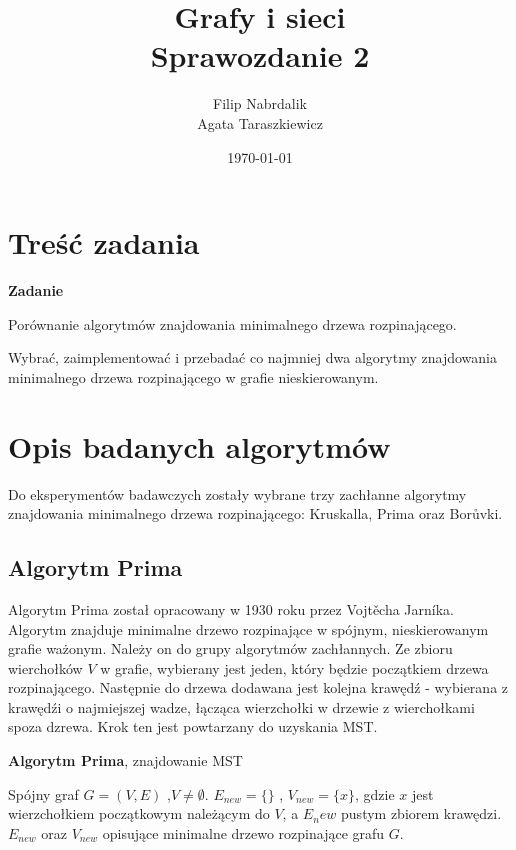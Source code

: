 \documentclass[a4paper, 10pt]{article}
\title{{\bf {Grafy i sieci}} \\ {\large Sprawozdanie 2}}
\date{\today}
\author{Filip Nabrdalik \\Agata Taraszkiewicz}
\begin{document}


\maketitle 




\newcommand{\ang}[1]{(ang. {\em #1}\/)}
\newcommand{\e}[1]{{\em #1}\/}





\section{Treść zadania}

{\bf{Zadanie}}

Porównanie algorytmów znajdowania minimalnego drzewa rozpinającego.

Wybrać, zaimplementować i przebadać co najmniej dwa algorytmy znajdowania minimalnego drzewa rozpinającego w grafie nieskierowanym. 

 

\section{Opis badanych algorytmów}

Do eksperymentów badawczych zostały wybrane trzy zachłanne algorytmy znajdowania minimalnego drzewa rozpinającego: Kruskalla, Prima oraz
Borůvki.

	\subsection{Algorytm Prima}
Algorytm Prima został opracowany w 1930 roku przez Vojtěcha Jarníka. Algorytm znajduje minimalne drzewo rozpinające w spójnym, nieskierowanym grafie ważonym. Należy on do grupy algorytmów zachłannych. Ze zbioru wierchołków $V$ w grafie, wybierany jest jeden, który będzie początkiem drzewa rozpinającego. Następnie do drzewa dodawana jest   
kolejna krawędź - wybierana z krawędźi o najmiejszej wadze, łącząca wierzchołki w drzewie z wierchołkami spoza dzrewa. Krok ten jest powtarzany do uzyskania MST.
\begin{algorithm}
\caption{{\bf Algorytm Prima}, znajdowanie MST}
\begin{algorithmic}[!h]
\REQUIRE Spójny graf $G=(V,E)$ ,$V \neq \emptyset$. 
\ENSURE $E_{new}=\{\}$ , $V_{new}=\{x\}$, gdzie $x$ jest wierzchołkiem początkowym należącym do $V$, a $E_new$ pustym zbiorem krawędzi.
\STATE {}
\STATE {}   
\ENDWHILE
\RETURN $E_{new}$ oraz $V_{new}$ opisujące minimalne drzewo rozpinające grafu $G$. 
\end{algorithmic}
\end{algorithm}	
\end{document}
